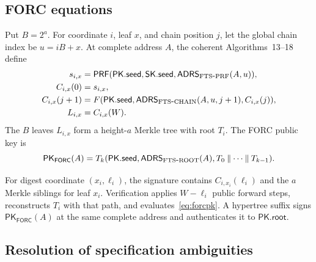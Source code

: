 \documentclass[11pt,a4paper]{article}
\newcommand{\concat}{\mathbin\Vert}
\newcommand{\PRF}{\ensuremath{\mathsf{PRF}}}
\newcommand{\FORC}{\ensuremath{\mathsf{FORC}}}
\newcommand{\pk}{\ensuremath{\mathsf{PK}}}
\newcommand{\sk}{\ensuremath{\mathsf{SK}}}
\begin{document}
\subsection{FORC equations}

Put $B=2^a$.  For coordinate $i$, leaf $x$, and chain position $j$, let the
global chain index be $u=iB+x$.  At complete address $A$, the coherent
Algorithms~13--18 define
\begin{align}
 s_{i,x}&=\PRF(\pk.\mathsf{seed},\sk.\mathsf{seed},
                  \mathsf{ADRS}_{\rm FTS\mbox{-}PRF}(A,u)),     \label{eq:secret}\\
 C_{i,x}(0)&=s_{i,x},\nonumber\\
 C_{i,x}(j+1)&=F(\pk.\mathsf{seed},
                  \mathsf{ADRS}_{\rm FTS\mbox{-}CHAIN}(A,u,j+1),
                  C_{i,x}(j)),                                 \label{eq:chain}\\
 L_{i,x}&=C_{i,x}(W).                                          \label{eq:leaf}
\end{align}
The $B$ leaves $L_{i,x}$ form a height-$a$ Merkle tree with root $T_i$.
The FORC public key is
\begin{equation}
 \mathsf{PK}_{\FORC}(A)=T_k(\pk.\mathsf{seed},
      \mathsf{ADRS}_{\rm FTS\mbox{-}ROOT}(A),
      T_0\concat\cdots\concat T_{k-1}).                       \label{eq:forcpk}
\end{equation}

For digest coordinate $(x_i,\ell_i)$, the signature contains
$C_{i,x_i}(\ell_i)$ and the $a$ Merkle siblings for leaf $x_i$.
Verification applies $W-\ell_i$ public forward steps, reconstructs $T_i$ with
that path, and evaluates~\eqref{eq:forcpk}.  A hypertree suffix signs
$\mathsf{PK}_{\FORC}(A)$ at the same complete address and authenticates it to
$\pk.\mathsf{root}$.

\subsection{Resolution of specification ambiguities}
\label{sec:ambiguities}
\end{document}
